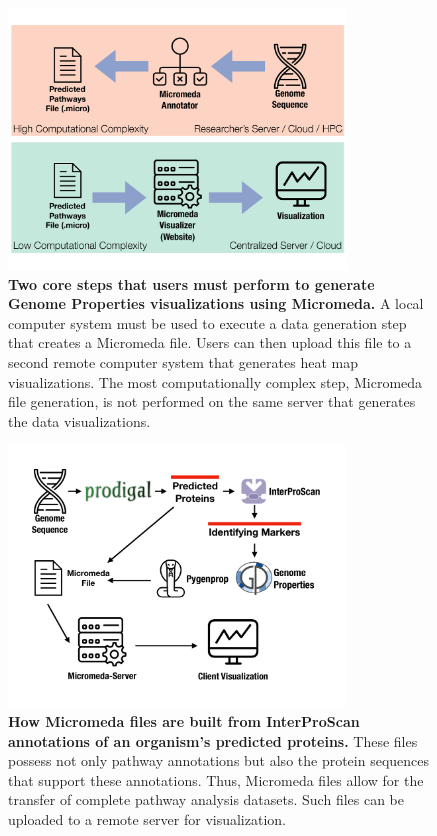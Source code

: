 \begin{figure}[!ht]
  \centering
	\includegraphics[width=0.8\textwidth]{media/micromeda-file-generation.pdf}
	 \caption[Two core steps that users must perform to generate Genome Properties 
visualizations using Micromeda.]{\textbf{Two core steps that users must perform 
to generate Genome Properties visualizations using Micromeda.} A local computer 
system must be used to execute a data generation step that creates a Micromeda 
file. Users can then upload this file to a second remote computer system that 
generates heat map visualizations. The most computationally complex step, 
Micromeda file generation, is not performed on the same server that generates 
the data visualizations.}
	 \label{fig:micromeda-file-generation}
\end{figure}

\begin{figure}[!ht]
  \centering
	\includegraphics[width=0.8\textwidth]{media/how-micromeda-files-are-built.pdf}
	 \caption[How Micromeda files are built from InterProScan annotations of an 
organism's predicted proteins.]{\textbf{How Micromeda files are built from 
InterProScan annotations of an organism's predicted proteins.} These files 
possess not only pathway annotations but also the protein sequences that support 
these annotations. Thus, Micromeda files allow for the transfer of complete 
pathway analysis datasets. Such files can be uploaded to a remote server for visualization.}
	 \label{fig:micromeda-file-building-and-use}
\end{figure}

